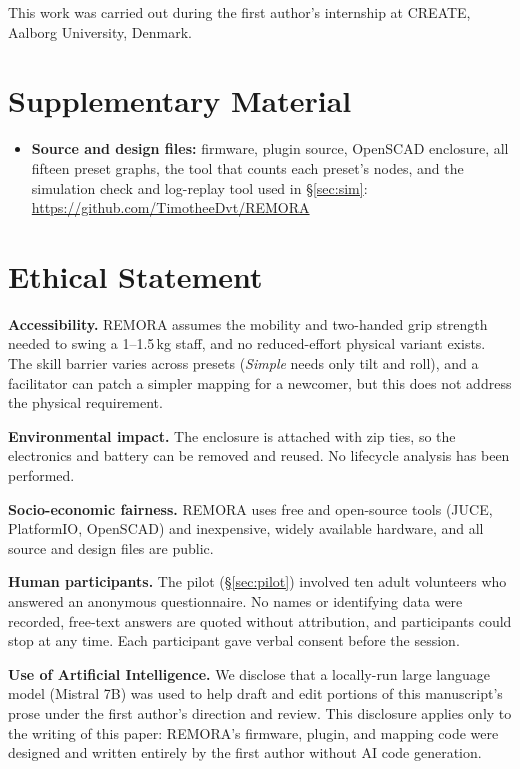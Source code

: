 \documentclass[sigconf,nonacm]{acmart}
\newcommand{\preset}[1]{\textit{#1}}
\begin{document}
\begin{acks}
This work was carried out during the first author's internship at CREATE, Aalborg University,
Denmark.
\end{acks}

\section{Supplementary Material}
\begin{itemize}
  \item \textbf{Source and design files:} firmware, plugin source, OpenSCAD enclosure, all fifteen
  preset graphs, the tool that counts each preset's nodes, and the simulation check and log-replay
  tool used in \S\ref{sec:sim}:
  \url{https://github.com/TimotheeDvt/REMORA}
\end{itemize}

\section{Ethical Statement}
\textbf{Accessibility.} REMORA assumes the mobility and two-handed grip strength needed to swing a
1--1.5\,kg staff, and no reduced-effort physical variant exists. The skill barrier varies across
presets (\preset{Simple} needs only tilt and roll), and a facilitator can patch a simpler mapping
for a newcomer, but this does not address the physical requirement.

\textbf{Environmental impact.} The enclosure is attached with zip ties, so the electronics and
battery can be removed and reused. No lifecycle analysis has been performed.

\textbf{Socio-economic fairness.} REMORA uses free and open-source tools (JUCE, PlatformIO,
OpenSCAD) and inexpensive, widely available hardware, and all source and design files are public.

\textbf{Human participants.} The pilot (\S\ref{sec:pilot}) involved ten adult volunteers who
answered an anonymous questionnaire. No names or identifying data were recorded, free-text answers
are quoted without attribution, and participants could stop at any time. Each participant gave
verbal consent before the session.

\textbf{Use of Artificial Intelligence.} We disclose that a locally-run large language model (Mistral 7B) was used to help draft and edit
portions of this manuscript's prose under the first author's direction and review. This disclosure
applies only to the writing of this paper: REMORA's firmware, plugin, and mapping code were designed
and written entirely by the first author without AI code generation.



\end{document}

